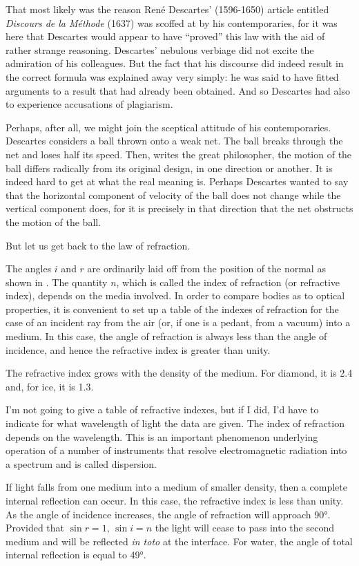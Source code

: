 That most likely was the reason Ren\'e Descartes’ (1596-1650) article entitled \emph{Discours de la M\'ethode} (1637) was scoffed at by his contemporaries, for it was here that Descartes would appear to have ``proved'' this law with the aid of rather strange reasoning. Descartes’ nebu­lous verbiage did not excite the admiration of his colleagues. But the fact that his discourse did indeed result in the correct formula was explained away very simply: he was said to have fitted arguments to a result that had already been obtained. And so Descartes had also to experience accusations of plagiarism.

Perhaps, after all, we might join the sceptical attitude of his contemporaries. Descartes considers a ball thrown onto a weak net. The ball breaks through the net and loses half its speed. Then, writes the great philosopher, the motion of the ball differs radically from its original design, in one direction or another. It is indeed hard to get at what the real meaning is. Perhaps Descartes wanted to say that the horizontal component of velocity of the ball does not change while the vertical component does, for it is precisely in that direction that the net obstructs the motion of the ball.

But let us get back to the law of refraction.

The angles $i$ and $r$ are ordinarily laid off from the position of the normal as shown in . The quan­tity $n$, which is called the index of refraction (or refrac­tive index), depends on the media involved. In order to compare bodies as to optical properties, it is convenient to set up a table of the indexes of refraction for the case of an incident ray from the air (or, if one is a pedant, from a vacuum) into a medium. In this case, the angle of refraction is always less than the angle of incidence, and hence the refractive index is greater than unity.

The refractive index grows with the density of the medium. For diamond, it is 2.4 and, for ice, it is 1.3. 

I'm not going to give a table of refractive indexes, but if I did, I’d have to indicate for what wavelength of light the data are given. The index of refraction depends on the wavelength. This is an important phenomenon underlying operation of a number of instruments that resolve electromagnetic radiation into a spectrum and is called dispersion.

If light falls from one medium into a medium of smaller density, then a complete internal reflection can occur. In this case, the refractive index is less than unity. As the angle of incidence increases, the angle of refraction will approach \ang{90}. Provided that $\sin r = 1,\, \sin i = n$ the light will cease to pass into the second medium and will be reflected \emph{in toto} at the interface. For water, the angle of total internal reflection is equal to \ang{49}.

